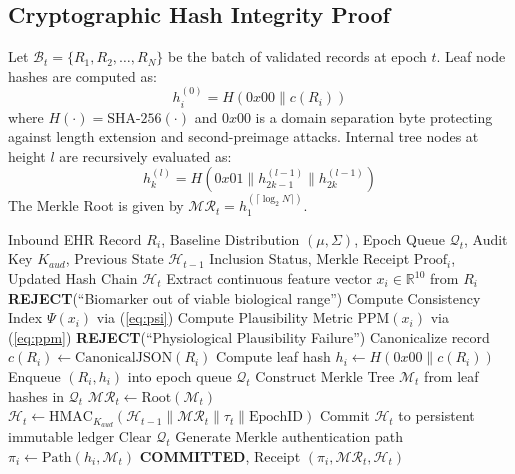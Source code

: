 \documentclass[conference]{IEEEtran}
\begin{document}
\subsection{Cryptographic Hash Integrity Proof}
Let $\mathcal{B}_t = \{R_1, R_2, \dots, R_N\}$ be the batch of validated records at epoch $t$. Leaf node hashes are computed as:
\begin{equation}
    h_{i}^{(0)} = H(0x00 \parallel c(R_i))
\end{equation}
where $H(\cdot) = \text{SHA-256}(\cdot)$ and $0x00$ is a domain separation byte protecting against length extension and second-preimage attacks. Internal tree nodes at height $l$ are recursively evaluated as:
\begin{equation}
    h_{k}^{(l)} = H(0x01 \parallel h_{2k-1}^{(l-1)} \parallel h_{2k}^{(l-1)})
\end{equation}
The Merkle Root is given by $\mathcal{MR}_t = h_1^{(\lceil \log_2 N \rceil)}$.

\begin{algorithm}[t]
\caption{EHR Ingestion, Plausibility Verification, and Merkle-Chaining}
\label{alg:ingestion}
\begin{algorithmic}[1]
\REQUIRE Inbound EHR Record $R_i$, Baseline Distribution $(\mu, \Sigma)$, Epoch Queue $\mathcal{Q}_t$, Audit Key $K_{aud}$, Previous State $\mathcal{H}_{t-1}$
\ENSURE Inclusion Status, Merkle Receipt $\text{Proof}_i$, Updated Hash Chain $\mathcal{H}_t$
\STATE Extract continuous feature vector $x_i \in \mathbb{R}^{10}$ from $R_i$
        \RETURN \textbf{REJECT}(``Biomarker out of viable biological range'')
    \ENDIF
\ENDFOR
\STATE Compute Consistency Index $\Psi(x_i)$ via (\ref{eq:psi})
\STATE Compute Plausibility Metric $\text{PPM}(x_i)$ via (\ref{eq:ppm})
    \RETURN \textbf{REJECT}(``Physiological Plausibility Failure'')
\ENDIF
\STATE Canonicalize record $c(R_i) \leftarrow \text{CanonicalJSON}(R_i)$
\STATE Compute leaf hash $h_i \leftarrow H(0x00 \parallel c(R_i))$
\STATE Enqueue $(R_i, h_i)$ into epoch queue $\mathcal{Q}_t$
    \STATE Construct Merkle Tree $\mathcal{M}_t$ from leaf hashes in $\mathcal{Q}_t$
    \STATE $\mathcal{MR}_t \leftarrow \text{Root}(\mathcal{M}_t)$
    \STATE $\mathcal{H}_t \leftarrow \text{HMAC}_{K_{aud}}(\mathcal{H}_{t-1} \parallel \mathcal{MR}_t \parallel \tau_t \parallel \text{EpochID})$
    \STATE Commit $\mathcal{H}_t$ to persistent immutable ledger
    \STATE Clear $\mathcal{Q}_t$
\ENDIF
\STATE Generate Merkle authentication path $\pi_i \leftarrow \text{Path}(h_i, \mathcal{M}_t)$
\RETURN \textbf{COMMITTED}, Receipt $(\pi_i, \mathcal{MR}_t, \mathcal{H}_t)$
\end{algorithmic}
\end{algorithm}
\end{document}
